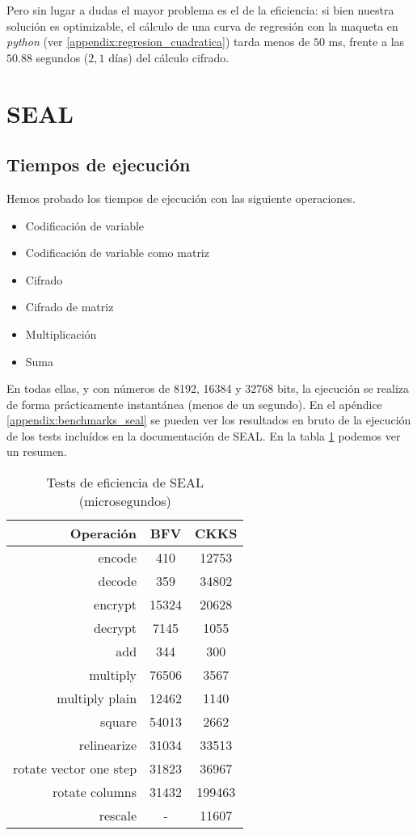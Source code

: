 Pero sin lugar a dudas el mayor problema es el de la eficiencia: si bien nuestra solución es optimizable, el cálculo de una curva de regresión con la maqueta en \textit{python} (ver \ref{appendix:regresion_cuadratica}) tarda menos de $50$ ms, frente a las $50.88$ segundos ($2,1$ días) del cálculo cifrado.

\section{SEAL}

\subsection{Tiempos de ejecución}

Hemos probado los tiempos de ejecución con las siguiente operaciones.

\begin{itemize}
    \item Codificación de variable
    \item Codificación de variable como matriz
    \item Cifrado
    \item Cifrado de matriz
    \item Multiplicación
    \item Suma
\end{itemize}

En todas ellas, y con números de 8192, 16384 y 32768 bits, la ejecución se realiza de forma prácticamente instantánea (menos de un segundo). En el apéndice \ref{appendix:benchmarks_seal} se pueden ver los resultados en bruto de la ejecución de los tests incluídos en la documentación de SEAL. En la tabla \ref{table:benchmarks_seal} podemos ver un resumen.

\begin{table}[]
    \centering
    \begin{tabular}{r | c c}
        Operación   & BFV & CKKS  \\
        \hline \hline
        encode  & 410  & 12753 \\
        decode  & 359  & 34802 \\
        encrypt & 15324 & 20628 \\
        decrypt & 7145  & 1055 \\
        add & 344 & 300 \\
        multiply  & 76506  & 3567 \\
        multiply plain  & 12462  & 1140 \\
        square  & 54013  & 2662 \\
        relinearize & 31034 & 33513 \\
        rotate vector one step  & 31823  & 36967 \\
        rotate columns  & 31432  & 199463 \\
        rescale  & - & 11607
    \end{tabular}
    \caption{Tests de eficiencia de SEAL (microsegundos)}
    \label{table:benchmarks_seal}
\end{table}

